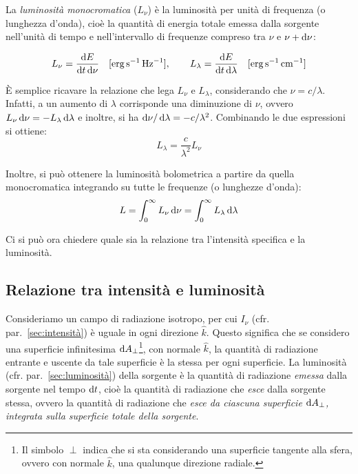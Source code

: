 La \emph{luminosità monocromatica} ($L_\nu$) è la luminosità per unità di frequenza (o lunghezza d'onda), cioè la quantità di energia totale emessa dalla sorgente nell'unità di tempo e nell'intervallo di frequenze compreso tra $\nu$ e $\nu + \ud \nu$:

\begin{equation}\label{eq:def-luminosità-monocromatica}
    L_\nu = \frac{\ud E}{\ud t \ud \nu} \quad [\si{erg.s^{-1}.Hz^{-1}}], \qquad L_\lambda = \frac{\ud E}{\ud t \ud \lambda} \quad [\si{erg.s^{-1}.cm^{-1}}]
\end{equation}

È semplice ricavare la relazione che lega $L_\nu$ e $L_\lambda$, considerando che $\nu = c / \lambda$. Infatti, a un aumento di $\lambda$ corrisponde una diminuzione di $\nu$, ovvero $L_\nu \ud \nu = - L_\lambda \ud \lambda$ e inoltre, si ha $\ud \nu / \ud \lambda = - c / \lambda^2$. Combinando le due espressioni si ottiene:
\begin{equation}\label{eq:luminosità-monocromatica}
    L_\lambda = \frac{c}{\lambda^2} L_\nu
\end{equation}

Inoltre, si può ottenere la luminosità bolometrica a partire da quella monocromatica integrando su tutte le frequenze (o lunghezze d'onda):
\begin{equation}\label{eq:luminosità-bolometrica}
    L = \int_0^\infty L_\nu \ud \nu = \int_0^\infty L_\lambda \ud \lambda
\end{equation}

Ci si può ora chiedere quale sia la relazione tra l'intensità specifica e la luminosità.

\subsection{Relazione tra intensità e luminosità}\label{sec:relazione-intensità-luminosità}
Consideriamo un campo di radiazione isotropo, per cui $I_\nu$ (cfr. par.~\ref{sec:intensità}) è uguale in ogni direzione $\hat{k}$. Questo significa che se considero una superficie infinitesima $\ud A_\perp$\footnote{Il simbolo $\perp$ indica che si sta considerando una superficie tangente alla sfera, ovvero con normale $\hat{k}$, una qualunque direzione radiale.}, con normale $\hat{k}$, la quantità di radiazione entrante e uscente da tale superficie è la stessa per ogni superficie. La luminosità (cfr. par.~\ref{sec:luminosità}) della sorgente è la quantità di radiazione \emph{emessa} dalla sorgente nel tempo $\ud t$, cioè la quantità di radiazione che \emph{esce} dalla sorgente stessa, ovvero la quantità di radiazione che \emph{esce da ciascuna superficie $\ud A_\perp$, integrata sulla superficie totale della sorgente}.

